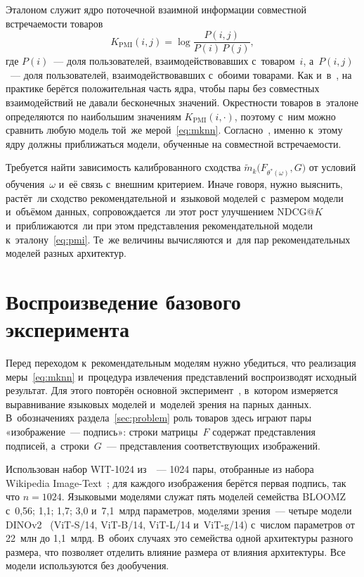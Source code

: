 \documentclass[a4paper,12pt]{article}
\begin{document}
Эталоном служит ядро поточечной взаимной информации совместной встречаемости товаров
\begin{equation}\label{eq:pmi}
  K_{\mathrm{PMI}}(i,j)=\log\frac{P(i,j)}{P(i)\,P(j)},
\end{equation}
где $P(i)$~--- доля пользователей, взаимодействовавших с~товаром~$i$, а~$P(i,j)$~---
доля пользователей, взаимодействовавших с~обоими товарами. Как и~в~\cite{levy2014implicit},
на практике берётся положительная часть ядра, чтобы пары без совместных взаимодействий
не давали бесконечных значений. Окрестности товаров в~эталоне определяются по наибольшим
значениям $K_{\mathrm{PMI}}(i,\cdot)$, поэтому с~ним можно сравнить любую модель той~же
мерой~\eqref{eq:mknn}. Согласно~\cite{huh2024platonic,levy2014implicit}, именно к~этому
ядру должны приближаться модели, обученные на совместной встречаемости.

Требуется найти зависимость калиброванного сходства
$\tilde m_k\bigl(F_{\theta^{*}(\omega)},G\bigr)$ от условий обучения~$\omega$ и~её связь
с~внешним критерием. Иначе говоря, нужно выяснить, растёт~ли сходство рекомендательной
и~языковой моделей с~размером модели и~объёмом данных, сопровождается~ли этот рост
улучшением NDCG@$K$ и~приближаются~ли при этом представления рекомендательной модели
к~эталону~\eqref{eq:pmi}. Те~же величины вычисляются и~для пар рекомендательных моделей
разных архитектур.

\section{Воспроизведение базового эксперимента}\label{sec:exp0}

Перед переходом к~рекомендательным моделям нужно убедиться, что реализация
меры~\eqref{eq:mknn} и~процедура извлечения представлений воспроизводят исходный
результат. Для этого повторён основной эксперимент~\cite{huh2024platonic}, в~котором
измеряется выравнивание языковых моделей и~моделей зрения на парных данных.
В~обозначениях раздела~\ref{sec:problem} роль товаров здесь играют пары
«изображение~--- подпись»: строки матрицы~$F$ содержат представления подписей,
а~строки~$G$~--- представления соответствующих изображений.

Использован набор \mbox{WIT-1024} из~\cite{huh2024platonic}~--- 1024 пары, отобранные из набора
Wikipedia Image-Text~\cite{srinivasan2021wit}; для каждого изображения берётся первая
подпись, так что $n=1024$. Языковыми моделями служат пять моделей семейства
BLOOMZ~\cite{muennighoff2023bloomz} с~0,56; 1,1; 1,7; 3,0 и~7,1~млрд параметров,
моделями зрения~--- четыре модели DINOv2~\cite{oquab2024dinov2} (\mbox{ViT-S/14}, \mbox{ViT-B/14},
\mbox{ViT-L/14} и~\mbox{ViT-g/14}) с~числом параметров от 22~млн до 1,1~млрд. В~обоих случаях это
семейства одной архитектуры разного размера, что позволяет отделить влияние размера
от влияния архитектуры. Все модели используются без дообучения.
\end{document}
